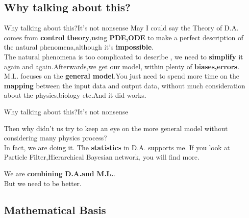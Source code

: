 \documentclass{beamer}
\begin{document}
\subsection {Why talking about this?}
\begin{frame}{Why talking about this?}{\quad \quad \quad It\rq{}s not nonsense}
May I could say the Theory of D.A. comes from \textbf{control theory},using \textbf{PDE,ODE} to make a perfect description of the natural phenomena,although it\rq{}s \textbf{impossible}.\\The natural phenomena is too complicated to describe , we need to \textbf{simplify} it again and again.Afterwards,we get our model, within plenty of \textbf{biases,errors}.\\
M.L. focuses on the \textbf{general model}.You just need to spend more time on the \textbf{mapping} between the input data and output data, without much consideration about the physics,biology etc.And it did works. 
\end{frame}

\begin{frame}{Why talking about this?}{\quad \quad \quad It\rq{}s not nonsense}

Then why didn\rq{}t us try to keep an eye on the more general model without considering many physics process? \\
In fact, we are doing it. The \textbf{statistics} in D.A. supports me. If you look at Particle Filter,Hierarchical Bayesian network, you will find more.

We are \textbf{combining D.A.and M.L.}.\\
But we need to be better.
\end{frame}


\subsection{Mathematical Basis}
\end{document}
